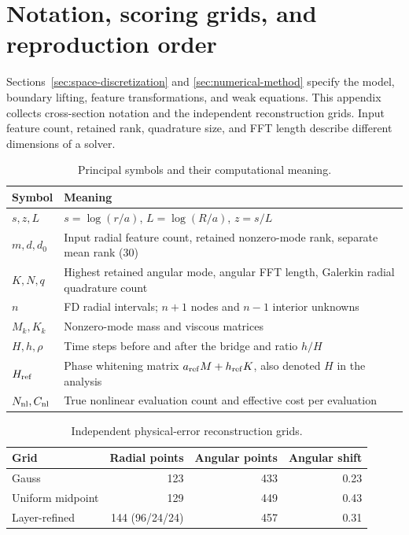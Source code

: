 \appendix
\section{Notation, scoring grids, and reproduction order}\label{sec:app-setup}

Sections~\ref{sec:space-discretization} and \ref{sec:numerical-method} specify the model, boundary lifting, feature transformations, and weak equations. This appendix collects cross-section notation and the independent reconstruction grids. Input feature count, retained rank, quadrature size, and FFT length describe different dimensions of a solver.

\begin{table}[!htbp]
\centering\small
\caption{Principal symbols and their computational meaning.}
\begin{tabularx}{\linewidth}{@{}lX@{}}
\toprule
Symbol & Meaning \\
\midrule
$s,z,L$ & $s=\log(r/a)$, $L=\log(R/a)$, $z=s/L$ \\
$m,d,d_0$ & Input radial feature count, retained nonzero-mode rank, separate mean rank (30) \\
$K,N,q$ & Highest retained angular mode, angular FFT length, Galerkin radial quadrature count \\
$n$ & FD radial intervals; $n+1$ nodes and $n-1$ interior unknowns \\
$M_k,K_k$ & Nonzero-mode mass and viscous matrices \\
$H,h,\rho$ & Time steps before and after the bridge and ratio $h/H$ \\
$H_{\rm ref}$ & Phase whitening matrix $a_{\rm ref}M+h_{\rm ref}K$, also denoted $H$ in the analysis \\
$N_{\rm nl},C_{\rm nl}$ & True nonlinear evaluation count and effective cost per evaluation \\
\bottomrule
\end{tabularx}
\end{table}

\begin{table}[!htbp]
\centering\small
\caption{Independent physical-error reconstruction grids.}
\label{tab:app-score-grids}
\begin{tabularx}{\linewidth}{@{}Xrrr@{}}
\toprule
Grid & Radial points & Angular points & Angular shift \\
\midrule
Gauss & 123 & 433 & 0.23 \\
Uniform midpoint & 129 & 449 & 0.43 \\
Layer-refined & 144 (96/24/24) & 457 & 0.31 \\
\bottomrule
\end{tabularx}
\end{table}

